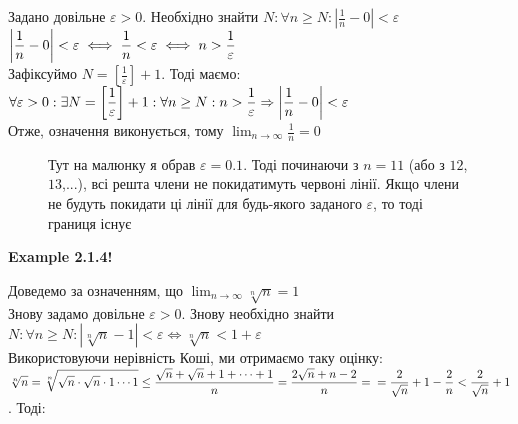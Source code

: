 \documentclass[a4paper, 14pt]{extarticle}
\def\huge{\displaystyle}
\begin{document}
	Задано довільне $\varepsilon > 0$. Необхідно знайти $\displaystyle N: \forall n \geq N: \left|\frac{1}{n}-0 \right|<\varepsilon$\\
	$\huge \abs{\frac{1}{n} - 0} < \varepsilon \iff \displaystyle \frac{1}{n}<\varepsilon \iff n > \frac{1}{\varepsilon}$\\
	Зафіксуймо $\displaystyle N = \left[\frac{1}{\varepsilon} \right] + 1$. Тоді маємо:\\
	$\forall \varepsilon > 0: \exists N = \huge \left[\frac{1}{\varepsilon} \right] + 1: \forall n \geq N: n > \frac{1}{\varepsilon} \Rightarrow \abs{\frac{1}{n} - 0} < \varepsilon$\\
	Отже, означення виконується, тому $\displaystyle\lim_{n \to \infty} \frac{1}{n} = 0$\\
\begin{figure}[H]
\centering
\resizebox{0.8\textwidth}{!} {
}
\caption*{Тут на малюнку я обрав $\varepsilon = 0.1$. Тоді починаючи з $n=11$ (або з $12$, $13$,...), всі решта члени не покидатимуть червоні лінії. Якщо члени не будуть покидати ці лінії для будь-якого заданого $\varepsilon$, то тоді границя існує \\}
\end{figure}
	\hypertarget{ex2.1.4.}{\textbf{Example 2.1.4!}} Доведемо за означенням, що $\displaystyle\lim_{n \to \infty} \sqrt[n]{n}=1$\\
	Знову задамо довільне $\varepsilon > 0$. Знову необхідно знайти $\displaystyle N: \forall n \geq N: \left|\sqrt[n]{n}-1  \right|<\varepsilon \iff \sqrt[n]{n}<1+\varepsilon$\\
	Використовуючи нерівність Коші, ми отримаємо таку оцінку:\\
	$\displaystyle \sqrt[n]{n}= \sqrt[n]{\sqrt{n}\cdot\sqrt{n}\cdot 1 \cdots 1} \leq \frac{\sqrt{n}+\sqrt{n}+1+\cdots+1}{n} = \frac{2\sqrt{n}+n-2}{n} = \\ = \frac{2}{\sqrt{n}}+1-\frac{2}{n}<\frac{2}{\sqrt{n}}+1$. Тоді:\\
\end{document}
